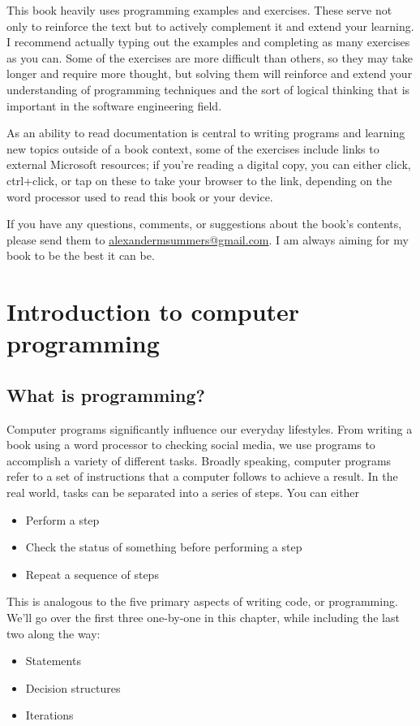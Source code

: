 \documentclass[oneside, openany] {book}
\begin{document}
This book heavily uses programming examples and exercises. These serve not only to reinforce the text but to actively complement it and extend your learning. I recommend actually typing out the examples and completing as many exercises as you can. Some of the exercises are more difficult than others, so they may take longer and require more thought, but solving them will reinforce and extend your understanding of programming techniques and the sort of logical thinking that is important in the software engineering field.

As an ability to read documentation is central to writing programs and learning new topics outside of a book context, some of the exercises include links to external Microsoft resources; if you're reading a digital copy, you can either click, ctrl+click, or tap on these to take your browser to the link, depending on the word processor used to read this book or your device.

If you have any questions, comments, or suggestions about the book's contents, please send them to \href{mailto:alexandermsummers@gmail.com}{alexandermsummers@gmail.com}. I am always aiming for my book to be the best it can be.
\mainmatter
\chapter{Introduction to computer programming}
\minitoc
\section{What is programming?}
Computer programs significantly influence our everyday lifestyles. From writing a book using a word processor to checking social media, we use programs to accomplish a variety of different tasks. Broadly speaking, computer programs refer to a set of instructions that a computer follows to achieve a result.
In the real world, tasks can be separated into a series of steps. You can either
\begin{itemize}
\item Perform a step
\item Check the status of something before performing a step
\item Repeat a sequence of steps
\end{itemize}

This is analogous to the five primary aspects of writing code, or programming. We'll go over the first three one-by-one in this chapter, while including the last two along the way:
\begin{itemize}
\item Statements
\item Decision structures
\item Iterations
\end{itemize}
\end{document}

